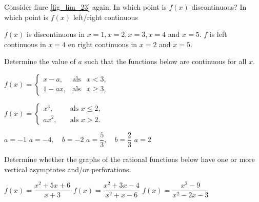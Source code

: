 \ifcalculus
\begin{Exercise}[difficulty = 1, label = oef_grafiek_cont] Consider fiure \ref{fig_lim_23} again. In which point is $f(x)$ discontinuous? In which point is $f(x)$ left/right continuous

\end{Exercise}

\begin{Answer}\phantom{}
    $f(x)$ is discontinuous in $x=1, x=2, x=3, x=4$ and $x=5$. $f$ is left continuous in $x=4$ en right continuous in $x=2$ and $x=5$.
\end{Answer}

\begin{Exercise} Determine the value of $a$ such that the functions below are continuous for all $x$.
\begin{multicols}{2}
    \Question[difficulty = 1] $f(x)=\left\{\begin{array}{lcl}
    x-a,  & \mbox{als} & x < 3, \\[0.2cm]
    1-ax,  & \mbox{als} & x \geq 3, 
    \end{array}\right.$
    
    \Question[difficulty = 1] $f(x)=\left\{\begin{array}{lcl}
    x^3,  & \quad \mbox{als } x \leq 2, \\[0.2cm]
    ax^2, & \quad  \mbox{als } x > 2.
    \end{array}\right.$
    
    \EndCurrentQuestion
\end{multicols}

\end{Exercise}

\begin{Answer}\phantom{}
    \begin{multicols}{2}
    
        \Question $a=-1$
        \ifanalysis
        \Question $a=-4, \quad b=-2$
        \Question $a=\dfrac{5}{3}, \quad b=\dfrac{2}{3}$
        \fi
        \Question $a=2$
    \EndCurrentQuestion
    \end{multicols}
\end{Answer}
\fi




\begin{Exercise} Determine whether the graphs of the rational functions below have one or more vertical asymptotes and/or perforations. %
\begin{multicols}{2}
	\Question[difficulty = 1] $f(x) = \dfrac{x^2+5x+6}{x+3} $ 
	\Question[difficulty = 1] $f(x) = \dfrac{x^2+3x-4}{x^2 +x-6} $ 
	\Question[difficulty = 1] $f(x) = \dfrac{x^2-9}{x^2 -2x-3} $ 
    \EndCurrentQuestion
\end{multicols}

\end{Exercise}

